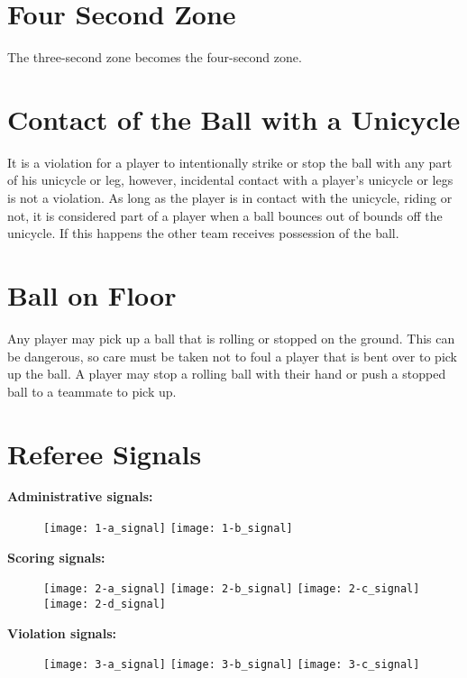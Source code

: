 \section{Four Second Zone}
The three-second zone becomes the four-second zone.

\section{Contact of the Ball with a Unicycle}
It is a violation for a player to intentionally strike or stop the ball with any part of his unicycle or leg, however, incidental
contact with a player's unicycle or legs is not a violation. As long as the player is in contact with the unicycle, riding or
not, it is considered part of a player when a ball bounces out of bounds off the unicycle. If this happens the other team
receives possession of the ball.

\section{Ball on Floor}
Any player may pick up a ball that is rolling or stopped on the ground. This can be dangerous, so care must be taken not to
foul a player that is bent over to pick up the ball. A player may stop a rolling ball with their hand or push a stopped ball to
a teammate to pick up.

\newpage

\section{Referee Signals}

\textbf{Administrative signals:}

\begin{figure}[h]
\texttt{[image: 1-a\_signal]}
\texttt{[image: 1-b\_signal]}
\end{figure}

\textbf{Scoring signals:}
\begin{figure}[h]
\texttt{[image: 2-a\_signal]}
\texttt{[image: 2-b\_signal]}
\texttt{[image: 2-c\_signal]}
\texttt{[image: 2-d\_signal]}
\end{figure}

\textbf{Violation signals:}

\begin{figure}[h]
\texttt{[image: 3-a\_signal]}
\texttt{[image: 3-b\_signal]}
\texttt{[image: 3-c\_signal]}

\end{figure}

